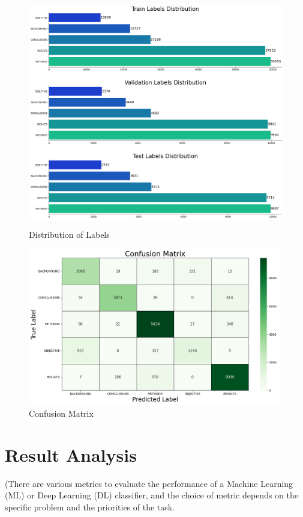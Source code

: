 \documentclass[12pt,a4paper]{report}     %
\begin{document}
\begin{normalsize}
{{{\begin{figure}[h]
    \centering
    \includegraphics[width=12cm,height=10cm]{labels_distribution.png}
    \caption{Distribution of Labels}
    \label{fig: sequence diagram}
\end{figure}

\begin{figure}[h]
    \centering
    \includegraphics[width=11cm]{confusion_matrix.png}
    \caption{Confusion Matrix}
    \label{fig: sequence diagram}
\end{figure}


\section{Result Analysis }
(There are various metrics to evaluate the performance of a Machine Learning (ML) or Deep Learning (DL) classifier, and the choice of metric depends on the specific problem and the priorities of the task. 

}}}
\end{normalsize}
\end{document}

